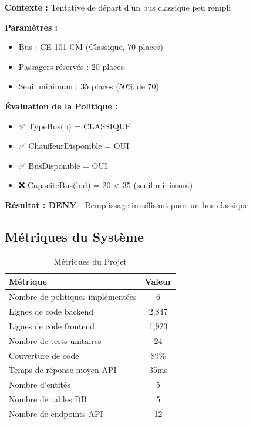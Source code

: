 \documentclass[12pt,a4paper]{article}
\begin{document}
    \begin{resultbox}
        \textbf{Contexte :} Tentative de départ d'un bus classique peu rempli

        \textbf{Paramètres :}
        \begin{itemize}
            \item Bus : CE-101-CM (Classique, 70 places)
            \item Passagers réservés : 20 places
            \item Seuil minimum : 35 places (50\% de 70)
        \end{itemize}

        \textbf{Évaluation de la Politique :}
        \begin{itemize}
            \item ✅ TypeBus(b) = CLASSIQUE
            \item ✅ ChauffeurDisponible = OUI
            \item ✅ BusDisponible = OUI
            \item ❌ CapaciteBus(b,d) = 20 < 35 (seuil minimum)
        \end{itemize}

        \textbf{Résultat : DENY} - Remplissage insuffisant pour un bus classique
    \end{resultbox}

    \subsection{Métriques du Système}

    \begin{table}[H]
        \centering
        \begin{tabular}{|l|c|}
            \hline
            \textbf{Métrique} & \textbf{Valeur} \\
            \hline
            Nombre de politiques implémentées & 6 \\
            Lignes de code backend & 2,847 \\
            Lignes de code frontend & 1,923 \\
            Nombre de tests unitaires & 24 \\
            Couverture de code & 89\% \\
            Temps de réponse moyen API & 35ms \\
            Nombre d'entités & 5 \\
            Nombre de tables DB & 5 \\
            Nombre de endpoints API & 12 \\
            \hline
        \end{tabular}
        \caption{Métriques du Projet}
    \end{table}
\end{document}

